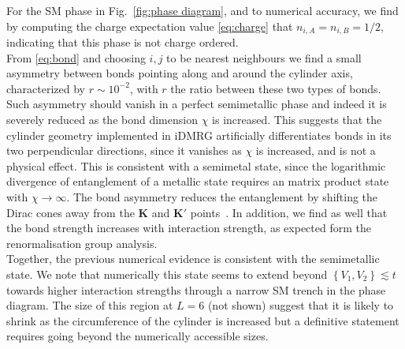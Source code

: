 \documentclass[aps,prx,10pt,twocolumn,floatfix,superscriptaddress,showpacs,numerical,footinbib]{revtex4-1}
\begin{document}
%
For the SM phase in Fig.~\ref{fig:phase diagram}, and to numerical accuracy, we find by computing the charge expectation value
\eqref{eq:charge} that $n_{i,A}=n_{i,B}=1/2$, indicating that this phase is not charge ordered.\\
%
From \eqref{eq:bond} and choosing $i,j$ to be nearest neighbours we find
a small asymmetry between bonds pointing along and around the cylinder axis,
characterized by $r\sim10^{-2}$, with $r$ the ratio between these two types of bonds.
%
Such asymmetry should vanish in a perfect semimetallic phase and indeed it is severely reduced as the bond dimension $\chi$ is increased.
% 
This suggests that the cylinder geometry implemented in iDMRG artificially differentiates bonds in its two perpendicular directions,
since it vanishes as $\chi$ is increased, and is not a physical effect.
%
This is consistent with a semimetal state, since the logarithmic divergence of entanglement of a metallic state requires an matrix product state with $\chi\to\infty$. 
%
The bond asymmetry reduces the entanglement by shifting the Dirac cones away from the $\mathbf{K}$ and $\mathbf{K'}$ points~\cite{ACJ15}.
%
In addition, we find as well that the bond strength increases with interaction strength, as expected form the renormalisation group analysis. \\
%
Together, the previous numerical evidence is consistent with the semimetallic state.
%
We note that numerically this state seems to extend beyond $\left\lbrace V_{1},V_{2}\right\rbrace \lesssim t$ towards
higher interaction strengths through a narrow SM trench in the phase diagram.
%
The size of this region at $L=6$ (not shown) suggest that it is likely to shrink as the circumference of the cylinder is increased but
a definitive statement requires going beyond the numerically accessible sizes. 
%
\end{document}
